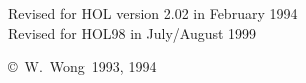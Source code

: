 \vspace{20pt}
\begin{center}
Revised for HOL version 2.02 in February 1994\\
Revised for HOL98 in July/August 1999
\end{center}
\vfill
\begin{center}
\copyright\ W.\ Wong\ 1993, 1994
\end{center}
\newpage
